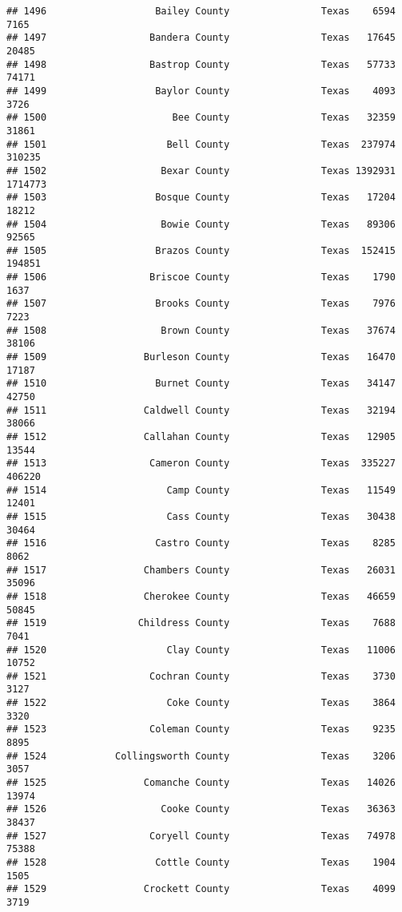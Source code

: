 \documentclass[
]{article}
\begin{document}
\begin{verbatim}
## 1496                   Bailey County                Texas    6594    7165
## 1497                  Bandera County                Texas   17645   20485
## 1498                  Bastrop County                Texas   57733   74171
## 1499                   Baylor County                Texas    4093    3726
## 1500                      Bee County                Texas   32359   31861
## 1501                     Bell County                Texas  237974  310235
## 1502                    Bexar County                Texas 1392931 1714773
## 1503                   Bosque County                Texas   17204   18212
## 1504                    Bowie County                Texas   89306   92565
## 1505                   Brazos County                Texas  152415  194851
## 1506                  Briscoe County                Texas    1790    1637
## 1507                   Brooks County                Texas    7976    7223
## 1508                    Brown County                Texas   37674   38106
## 1509                 Burleson County                Texas   16470   17187
## 1510                   Burnet County                Texas   34147   42750
## 1511                 Caldwell County                Texas   32194   38066
## 1512                 Callahan County                Texas   12905   13544
## 1513                  Cameron County                Texas  335227  406220
## 1514                     Camp County                Texas   11549   12401
## 1515                     Cass County                Texas   30438   30464
## 1516                   Castro County                Texas    8285    8062
## 1517                 Chambers County                Texas   26031   35096
## 1518                 Cherokee County                Texas   46659   50845
## 1519                Childress County                Texas    7688    7041
## 1520                     Clay County                Texas   11006   10752
## 1521                  Cochran County                Texas    3730    3127
## 1522                     Coke County                Texas    3864    3320
## 1523                  Coleman County                Texas    9235    8895
## 1524            Collingsworth County                Texas    3206    3057
## 1525                 Comanche County                Texas   14026   13974
## 1526                    Cooke County                Texas   36363   38437
## 1527                  Coryell County                Texas   74978   75388
## 1528                   Cottle County                Texas    1904    1505
## 1529                 Crockett County                Texas    4099    3719

\end{verbatim}
\end{document}
